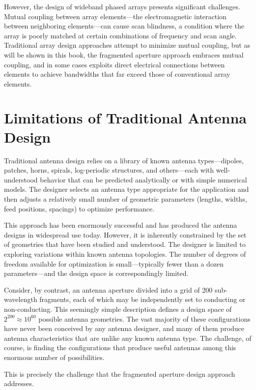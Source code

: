 However, the design of wideband phased arrays presents significant challenges.  Mutual coupling between array elements---the electromagnetic interaction between neighboring elements---can cause scan blindness, a condition where the array is poorly matched at certain combinations of frequency and scan angle.  Traditional array design approaches attempt to minimize mutual coupling, but as will be shown in this book, the fragmented aperture approach embraces mutual coupling, and in some cases exploits direct electrical connections between elements to achieve bandwidths that far exceed those of conventional array elements.

\section{Limitations of Traditional Antenna Design}

Traditional antenna design relies on a library of known antenna types---dipoles, patches, horns, spirals, log-periodic structures, and others---each with well-understood behavior that can be predicted analytically or with simple numerical models.  The designer selects an antenna type appropriate for the application and then adjusts a relatively small number of geometric parameters (lengths, widths, feed positions, spacings) to optimize performance.

This approach has been enormously successful and has produced the antenna designs in widespread use today.  However, it is inherently constrained by the set of geometries that have been studied and understood.  The designer is limited to exploring variations within known antenna topologies.  The number of degrees of freedom available for optimization is small---typically fewer than a dozen parameters---and the design space is correspondingly limited.

Consider, by contrast, an antenna aperture divided into a grid of 200 sub-wavelength fragments, each of which may be independently set to conducting or non-conducting.  This seemingly simple description defines a design space of $2^{200} \approx 10^{60}$ possible antenna geometries.  The vast majority of these configurations have never been conceived by any antenna designer, and many of them produce antenna characteristics that are unlike any known antenna type.  The challenge, of course, is finding the configurations that produce useful antennas among this enormous number of possibilities.

This is precisely the challenge that the fragmented aperture design approach addresses.

